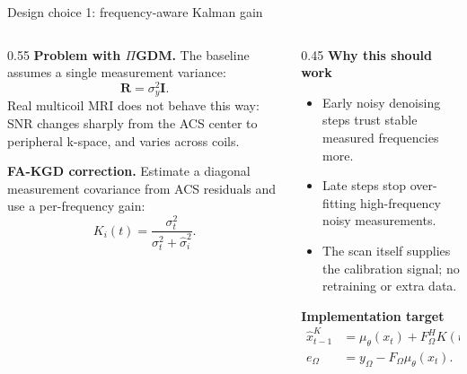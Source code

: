 \documentclass[aspectratio=169]{beamer}
\newcommand{\PIGDM}{$\Pi$GDM}
\newcommand{\hatsig}{\hat{\sigma}}
\newcommand{\muth}{\mu_\theta}
\begin{document}
\begin{frame}{Design choice 1: frequency-aware Kalman gain}
  \small
  \begin{columns}[T]
    \begin{column}{0.55\textwidth}
      \textbf{Problem with \PIGDM{}.} The baseline assumes a single measurement variance:
      \[
        \mathbf{R}=\sigma_y^2\mathbf{I}.
      \]
      Real multicoil MRI does not behave this way: SNR changes sharply from the ACS center to peripheral k-space, and varies across coils.
      \vspace{0.5em}

      \textbf{FA-KGD correction.} Estimate a diagonal measurement covariance from ACS residuals and use a per-frequency gain:
      \[
        K_i(t)=\frac{\sigma_t^2}{\sigma_t^2+\hatsig_i^2}.
      \]
    \end{column}
    \begin{column}{0.45\textwidth}
      \textbf{Why this should work}
      \begin{itemize}
        \item Early noisy denoising steps trust stable measured frequencies more.
        \item Late steps stop over-fitting high-frequency noisy measurements.
        \item The scan itself supplies the calibration signal; no retraining or extra data.
      \end{itemize}
      \vspace{0.4em}
      \textbf{Implementation target}
      \[
        \begin{aligned}
        \hat{x}^{K}_{t-1}
        &= \muth(x_t) + F_\Omega^H K(t)e_\Omega,\\
        e_\Omega &= y_\Omega-F_\Omega \muth(x_t).
        \end{aligned}
      \]
    \end{column}
  \end{columns}
\end{frame}
\end{document}
